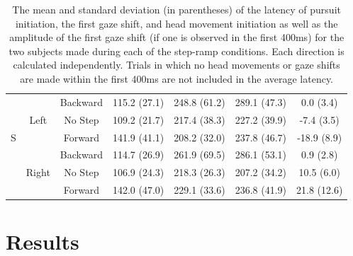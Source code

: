 \documentclass[12pt]{article}
\begin{document}
\begin{table}[h]
{\begin{tabular}{@{}ccccccc@{}}
        & \cellcolor[HTML]{EFEFEF}     & \cellcolor[HTML]{EFEFEF}Backward & \cellcolor[HTML]{EFEFEF}115.2 (27.1) & \cellcolor[HTML]{EFEFEF}248.8 (61.2) & \cellcolor[HTML]{EFEFEF}289.1 (47.3) & \cellcolor[HTML]{EFEFEF}0.0 (3.4)                                                   \\
        & \cellcolor[HTML]{EFEFEF}Left & \cellcolor[HTML]{EFEFEF}No Step  & \cellcolor[HTML]{EFEFEF}109.2 (21.7) & \cellcolor[HTML]{EFEFEF}217.4 (38.3) & \cellcolor[HTML]{EFEFEF}227.2 (39.9) & \cellcolor[HTML]{EFEFEF}-7.4 (3.5)                                                  \\
S       & \cellcolor[HTML]{EFEFEF}     & \cellcolor[HTML]{EFEFEF}Forward  & \cellcolor[HTML]{EFEFEF}141.9 (41.1) & \cellcolor[HTML]{EFEFEF}208.2 (32.0) & \cellcolor[HTML]{EFEFEF}237.8 (46.7) & \cellcolor[HTML]{EFEFEF}-18.9 (8.9)                                                 \\
        &                              & Backward                         & 114.7 (26.9)                         & 261.9 (69.5)                         & 286.1 (53.1)                         & 0.9 (2.8)                                                                           \\
        & Right                        & No Step                          & 106.9 (24.3)                         & 218.3 (26.3)                         & 207.2 (34.2)                         & 10.5 (6.0)                                                                          \\
        &                              & Forward                          & 142.0 (47.0)                         & 229.1 (33.6)                         & 236.8 (41.9)                         & 21.8 (12.6)                                                                         \\ \bottomrule
\end{tabular}
}
\caption[Latency during Step Ramp]{The mean and standard deviation (in parentheses) of the latency of pursuit initiation, the first gaze shift, and head movement initiation as well as the amplitude of the first gaze shift (if one is observed in the first 400ms) for the two subjects made during each of the step-ramp conditions. Each direction is calculated independently. Trials in which no head movements or gaze shifts are made within the first 400ms are not included in the average latency.}
\label{tab:StepRamp}
\end{table}

\section{Results}
\end{document}
